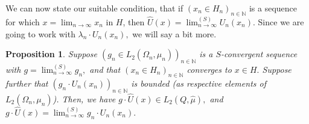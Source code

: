 \documentclass{amsart}
\newtheorem{prop}[thm]{Proposition}
\theoremstyle{definition}
\theoremstyle{remark}
\def \HMU{\hat{\mu}}
\def \HU{\hat{U}}
\begin{document}
We can now state our suitable condition, that if $(x_n\in H_n)_{n\in\mathbb{N}}$ is a sequence for which $x=\lim_{n\rightarrow\infty} x_n$ in $H$, then $\HU(x)=\lim^{(S)}_{n\rightarrow\infty} U_n(x_n).$  Since we are going to work with $\lambda_n\cdot U_n(x_n),$ we will say a bit more.

\begin{prop}\label{proposition_converging_isometry}
	Suppose $(g_n\in L_2(\Omega_n,\mu_n))_{n\in\mathbb{N}}$ is a $S$-convergent sequence with $g=\lim^{(S)}_{n\rightarrow\infty}g_n,$ and that $(x_n\in H_n)_{n\in\mathbb{N}}$ converges to $x\in H.$ Suppose further that $(g_n\cdot U_n(x_n))_{n\in\mathbb{N}}$ is bounded (as respective elements of $L_2(\Omega_n,\mu_n)$). Then, we have $g\cdot\HU(x)\in L_2(Q,\HMU),$ and $g\cdot \HU(x)=\lim^{(S)}_{n\rightarrow\infty} g_n\cdot U_n(x_n).$ 
\end{prop}
\end{document}
